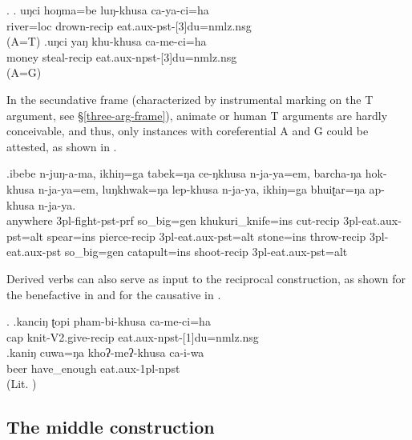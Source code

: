 \ex. \ag.	uŋci hoŋma=be luŋ-khusa ca-ya-ci=ha\\
		 river{\sc =loc} drown-{\sc recip}   eat{\sc .aux-pst-[3]du=nmlz.nsg}\\
	 (A=T)
 	\bg.uŋci yaŋ khu-khusa ca-me-ci=ha\\
	 money steal{\sc -recip} eat{\sc .aux-npst-[3]du=nmlz.nsg}\\
	 (A=G)
	
	
In the secundative frame (characterized by instrumental marking on the T argument, see §\ref{three-arg-frame}), animate or human T arguments are hardly conceivable, and thus, only instances with coreferential A and G could be attested, as shown in \Next.
	
	
\exg.ibebe n-juŋ-a-ma,   ikhiŋ=ga tabek=ŋa ce-ŋkhusa  n-ja-ya=em,  barcha-ŋa  hok-khusa  n-ja-ya=em, luŋkhwak=ŋa lep-khusa n-ja-ya, ikhiŋ=ga bhuiʈar=ŋa ap-khusa n-ja-ya.\\
	anywhere {\sc 3pl-}fight{\sc -pst-prf} so\_big{\sc =gen}  khukuri\_knife{\sc =ins} cut{\sc -recip} {\sc 3pl-}eat{\sc .aux-pst=alt} spear{\sc =ins} pierce{\sc -recip} {\sc 3pl-}eat{\sc .aux-pst=alt} stone{\sc =ins} throw{\sc -recip} {\sc 3pl-}eat{\sc .aux-pst} so\_big{\sc =gen} catapult{\sc =ins} shoot{\sc -recip} {\sc 3pl-}eat{\sc .aux-pst=alt}\\
	 
	

Derived verbs can also serve as input to the reciprocal construction, as shown for the benefactive in \Next[a] and for the causative in \Next[b].

	\ex. \ag.kanciŋ ʈopi pham-bi-khusa ca-me-ci=ha\\
	  cap knit{\sc -V2.give-recip} eat{\sc .aux-npst-[1]du=nmlz.nsg}		\\
	 \bg.kaniŋ cuwa=ŋa khoʔ-meʔ-khusa ca-i-wa\\
	 beer have\_enough eat{\sc .aux-1pl-npst}\\
	 (Lit. )



\subsection{The middle construction}\label{middle}

